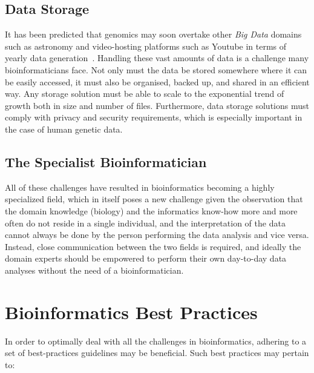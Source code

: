 \begin{justify}
\subsection{Data Storage}

It has been predicted that genomics may soon overtake other \emph{Big Data} domains such as astronomy and video-hosting platforms such as Youtube in terms of yearly data generation~\cite{Stephens2015}. Handling these vast amounts of data is a challenge many bioinformaticians face. Not only must the data be stored somewhere where it can be easily accessed, it must also be organised, backed up, and shared in an efficient way. Any storage solution must be able to scale to the exponential trend of growth both in size and number of files. Furthermore, data storage solutions must comply with privacy and security requirements, which is especially important in the case of human genetic data.


\subsection{The Specialist Bioinformatician}
All of these challenges have resulted in bioinformatics becoming a highly specialized field, which in itself poses a new challenge given the observation that the domain knowledge (biology) and the informatics know-how more and more often do not reside in a single individual, and the interpretation of the data cannot always be done by the person performing the data analysis and vice versa. Instead, close communication between the two fields is required, and ideally the domain experts should be empowered to perform their own day-to-day data analyses without the need of a bioinformatician.


\section{Bioinformatics Best Practices}

In order to optimally deal with all the challenges in bioinformatics, adhering to a set of best-practices guidelines may be beneficial. Such best practices may pertain to:


\end{justify}
